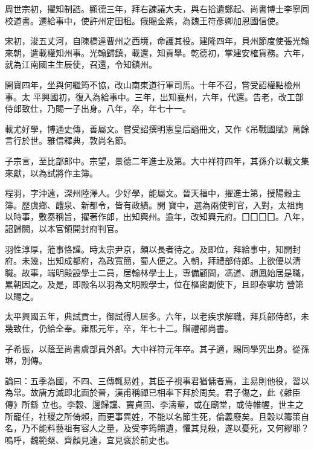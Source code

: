 \begin{pinyinscope}
 周世宗初，擢知制誥。顯德三年，拜右諫議大夫，與右拾遺鄭起、尚書博士李寧同校道書。遷給事中，使許州定田租。俄賜金紫，為魏王符彥卿加恩國信使。



 宋初，浚五丈河，自陳橋達曹州之西境，命護其役。建隆四年，貝州節度使張光翰來朝，遣載權知州事。光翰歸鎮，載還，知貢舉。乾德初，掌建安榷貨務。六年，就為江南國主生辰使，召還，令知鎮州。



 開寶四年，坐與何繼筠不協，改山南東道行軍司馬。十年不召，嘗受詔權點檢州事。太
 平興國初，復入為給事中。三年，出知襄州，六年，代還。告老，改工部侍郎致仕，乃賜一子出身。八年，卒，年七十一。



 載尤好學，博通史傳，善屬文。嘗受詔撰明憲皇后謚冊文，又作《吊戰國賦》萬餘言行於世。雅信釋典，敦尚名節。



 子宗言，至比部郎中。宗望，景德二年進士及第。大中祥符四年，其孫介以載文集來獻，以為試將作主簿。



 程羽，字沖遠，深州陸澤人。少好學，能屬文。晉天福中，擢進士第，授陽穀主簿。歷虞鄉、醴泉、新都令，皆有政績。開
 寶中，選為兩使判官，入對，太祖詢以時事，敷奏稱旨，擢著作郎，出知興州。逾年，改知興元府。囗囗囗囗。八年，詔歸闕，以本官領開封府判官。



 羽性淳厚，蒞事恪謹。時太宗尹京，頗以長者待之。及即位，拜給事中，知開封府。未幾，出知成都府，為政寬簡，蜀人便之。入朝，拜禮部侍郎。上欲優以清職。故事，端明殿設學士二員，居翰林學士上，專備顧問，馮道、趙鳳始居是職，累朝因之。及是，即殿名以羽為文明殿學士，位在樞密副使下，且即泰寧坊
 營第以賜之。



 太平興國五年，典試貢士，御試得人居多。六年，以老疾求解職，拜兵部侍郎，未幾致仕，仍給全奉。雍熙元年，卒，年七十二。贈禮部尚書。



 子希振，以蔭至尚書虞部員外郎。大中祥符元年卒。其子適，賜同學究出身。從孫琳，別傳。



 論曰：五季為國，不四、三傳輒易姓，其臣子視事君猶傭者焉，主易則他役，習以為常。故唐方滅即北面於晉，漢甫稱禪已相率下拜於周矣。君子傷之，此《雜臣傳》所繇
 立也。李穀、邊歸讜、竇貞固、李濤輩，或在廟堂，或侍帷幄，世主之所寵任，社稷之所倚賴，而更事異姓，不能以名節生死，倫義廢矣。且穀以籌策自名，乃不能料藝祖有容人之量，及受李筠饋遺，懼其見殺，遂以憂死，又何繆耶？嗚呼，魏範粲、齊顏見遠，宜見褒於前史也。



\end{pinyinscope}